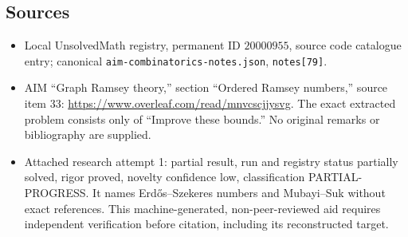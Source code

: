 \documentclass[11pt]{article}
\begin{document}
\subsection{Sources}
\begin{itemize}
\item Local UnsolvedMath registry, permanent ID $20000955$, source code catalogue entry; canonical \texttt{aim-combinatorics-notes.json}, \texttt{notes[79]}.
\item AIM ``Graph Ramsey theory,'' section ``Ordered Ramsey numbers,'' source item 33: \url{https://www.overleaf.com/read/mnvcscjjysvg}. The exact extracted problem consists only of ``Improve these bounds.'' No original remarks or bibliography are supplied.
\item Attached research attempt 1: partial result, run and registry status partially solved, rigor proved, novelty confidence low, classification PARTIAL-PROGRESS. It names Erd\H{o}s--Szekeres numbers and Mubayi--Suk without exact references. This machine-generated, non-peer-reviewed aid requires independent verification before citation, including its reconstructed target.
\end{itemize}
\end{document}

